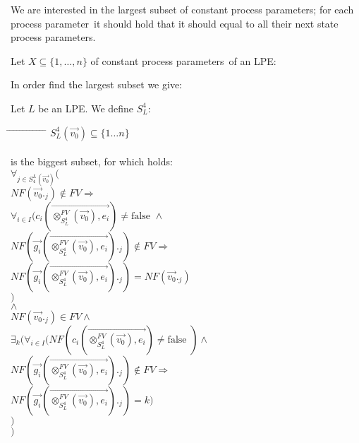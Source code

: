 \index{}\documentclass[a4paper,10pt]{article}
\theoremstyle{plain}
\theoremstyle{definition}
\newcommand{\ovr}{\overrightarrow}
\newcommand{\pp}{process parameter}
\newcommand{\pps}{process parameters}
\newcommand{\tab}{\hspace*{5.mm} \= \hspace*{5.mm} \= \hspace*{5.mm} \= \hspace*{5.mm} \= \hspace*{5.mm} \= \hspace*{5.mm}  \= \hspace*{5.mm}  \= \hspace*{5.mm}  \= \hspace*{5.mm} \= \hspace*{5.mm} \= \hspace*{5.mm}  \= \hspace*{5.mm}  \= \hspace*{5.mm}\kill}
\begin{document}
We are interested in the largest subset of constant \pps ; for each \pp\ it should hold that it should equal to all their next state \pps.

Let $X \subseteq \lbrace 1, \ldots, n \rbrace$ of constant \pps\ of an LPE:


\newcommand{\z}{(\ovr{\otimes_{S_L^4}^{FV}(\ovr{v_0}),e_i})}

\noindent In order find the largest subset we give: %
\begin{defn} \label{def:sug4} Let $L$ be an LPE. We define $S_L^4$:
\begin{tabbing}
\tab
$ S_L^4(\ovr{v_0}) \subseteq \lbrace 1 \ldots n  \rbrace $ \\ \\
is the biggest subset, for which holds:\\
\> $\forall_{j \in S^L_4(\ovr{v_0})}($\\
\> \>$NF(\ovr{v_0}._j) \not\in FV \Rightarrow $\\
\> \>$\forall_{i \in I} (c_i\z \neq \text{false } \wedge$ \\
\> \>$NF(\ovr{g_i}\z._j) \not\in FV \Rightarrow$\\
\> \> \> $NF(\ovr{g_i}\z._j)= NF(\ovr{v_0}._j)$\\
\> \> $)$\\
\> $\land$\\
\> \> $NF(\ovr{v_0}._j) \in FV \wedge$ \\
\> \>$ \exists_k(\forall_{i \in I} (NF(c_i\z \neq \text{false }) \wedge $\\
\> \>$ NF(\ovr{g_i}\z._j) \not\in FV \Rightarrow $ \\
\> \> \> $ NF(\ovr{g_i}\z._j)= k)$\\
\> \> $)$\\ 
\> $)$\\
\end{tabbing}
\end{defn}
\end{document}
